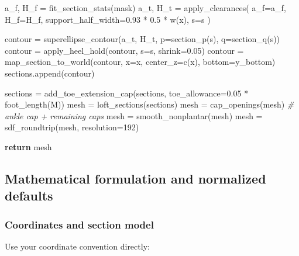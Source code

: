 \documentclass[
  10.5pt,
]{article}
\newenvironment{Shaded}{}{}
\newcommand{\CommentTok}[1]{\textcolor[rgb]{0.38,0.63,0.69}{\textit{#1}}}
\newcommand{\ControlFlowTok}[1]{\textcolor[rgb]{0.00,0.44,0.13}{\textbf{#1}}}
\newcommand{\DecValTok}[1]{\textcolor[rgb]{0.25,0.63,0.44}{#1}}
\newcommand{\FloatTok}[1]{\textcolor[rgb]{0.25,0.63,0.44}{#1}}
\newcommand{\NormalTok}[1]{#1}
\newcommand{\OperatorTok}[1]{\textcolor[rgb]{0.40,0.40,0.40}{#1}}
\begin{document}
\begin{Shaded}
\begin{Highlighting}[]
\NormalTok{        a\_f, H\_f }\OperatorTok{=}\NormalTok{ fit\_section\_stats(mask)}
\NormalTok{        a\_t, H\_t }\OperatorTok{=}\NormalTok{ apply\_clearances(}
\NormalTok{            a\_f}\OperatorTok{=}\NormalTok{a\_f,}
\NormalTok{            H\_f}\OperatorTok{=}\NormalTok{H\_f,}
\NormalTok{            support\_half\_width}\OperatorTok{=}\FloatTok{0.93} \OperatorTok{*} \FloatTok{0.5} \OperatorTok{*}\NormalTok{ w(x),}
\NormalTok{            s}\OperatorTok{=}\NormalTok{s}
\NormalTok{        )}

\NormalTok{        contour }\OperatorTok{=}\NormalTok{ superellipse\_contour(a\_t, H\_t, p}\OperatorTok{=}\NormalTok{section\_p(s), q}\OperatorTok{=}\NormalTok{section\_q(s))}
\NormalTok{        contour }\OperatorTok{=}\NormalTok{ apply\_heel\_hold(contour, s}\OperatorTok{=}\NormalTok{s, shrink}\OperatorTok{=}\FloatTok{0.05}\NormalTok{)}
\NormalTok{        contour }\OperatorTok{=}\NormalTok{ map\_section\_to\_world(contour, x}\OperatorTok{=}\NormalTok{x, center\_z}\OperatorTok{=}\NormalTok{c(x), bottom}\OperatorTok{=}\NormalTok{y\_bottom)}
\NormalTok{        sections.append(contour)}

\NormalTok{    sections }\OperatorTok{=}\NormalTok{ add\_toe\_extension\_cap(sections, toe\_allowance}\OperatorTok{=}\FloatTok{0.05} \OperatorTok{*}\NormalTok{ foot\_length(M))}
\NormalTok{    mesh }\OperatorTok{=}\NormalTok{ loft\_sections(sections)}
\NormalTok{    mesh }\OperatorTok{=}\NormalTok{ cap\_openings(mesh)         }\CommentTok{\# ankle cap + remaining caps}
\NormalTok{    mesh }\OperatorTok{=}\NormalTok{ smooth\_nonplantar(mesh)}
\NormalTok{    mesh }\OperatorTok{=}\NormalTok{ sdf\_roundtrip(mesh, resolution}\OperatorTok{=}\DecValTok{192}\NormalTok{)}

    \ControlFlowTok{return}\NormalTok{ mesh}
\end{Highlighting}
\end{Shaded}

\subsection{Mathematical formulation and normalized
defaults}\label{mathematical-formulation-and-normalized-defaults}

\subsubsection{Coordinates and section
model}\label{coordinates-and-section-model}

Use your coordinate convention directly:
\end{document}

